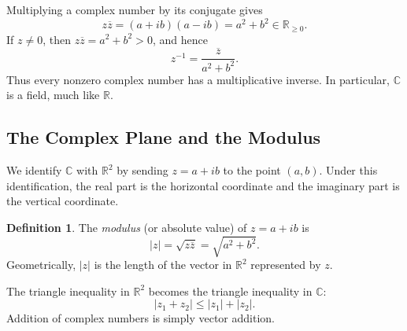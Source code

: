 \documentclass[11pt]{article}
\theoremstyle{definition}
\newtheorem{definition}{Definition}
\theoremstyle{remark}
\newcommand{\C}{\mathbb{C}}
\newcommand{\R}{\mathbb{R}}
\begin{document}
Multiplying a complex number by its conjugate gives
\[
  z\overline{z}=(a+ib)(a-ib)=a^2+b^2\in\R_{\ge 0}.
\]
If $z\ne 0$, then $z\overline z=a^2+b^2>0$, and hence
\[
  z^{-1}=\frac{\overline z}{a^2+b^2}.
\]
Thus every nonzero complex number has a multiplicative inverse.  In
particular, $\C$ is a field, much like $\R$.

\subsection{The Complex Plane and the Modulus}

We identify $\C$ with $\R^2$ by sending $z=a+ib$ to the point $(a,b)$.
Under this identification, the real part is the horizontal coordinate and
the imaginary part is the vertical coordinate.

\begin{center}
\end{center}

\begin{definition}
The \emph{modulus} (or absolute value) of $z=a+ib$ is
\[
  |z|=\sqrt{z\overline z}=\sqrt{a^2+b^2}.
\]
Geometrically, $|z|$ is the length of the vector in $\R^2$ represented by
$z$.
\end{definition}

The triangle inequality in $\R^2$ becomes the triangle inequality in $\C$:
\[
  |z_1+z_2|\le |z_1|+|z_2|.
\]
Addition of complex numbers is simply vector addition.

\begin{center}
\end{center}
\end{document}
